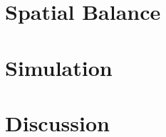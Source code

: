 \documentclass[12pt,english]{article}\usepackage[]{graphicx}\usepackage{xcolor}
\begin{document}

\section{Spatial Balance}


\section{Simulation}


\section{Discussion}
\end{document}

